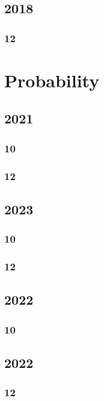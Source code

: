 \documentclass[11pt]{book}
\begin{document}
\section{2018}
\subsection{12}







\chapter{Probability}
\section{2021}
\subsection{10}

\subsection{12}

\section{2023}
\subsection{10}

\subsection{12}

\section{2022}
\subsection{10}

\section{2022}
\subsection{12}

\end{document}
